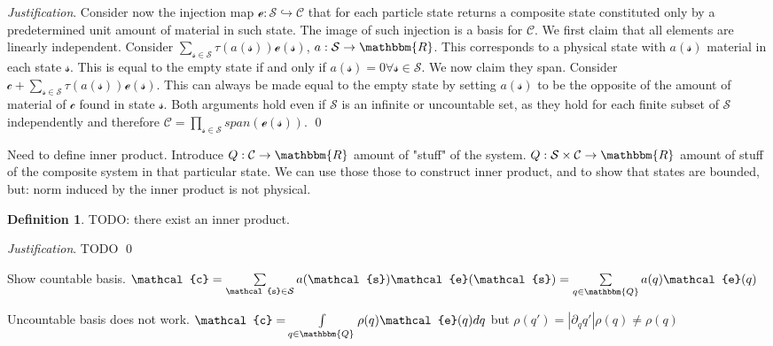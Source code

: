 \documentclass[aps,pra,10pt,twocolumn,floatfix,nofootinbib]{revtex4-1}
\theoremstyle{definition}
\newtheorem{defn}[prop]{Definition}
\newenvironment{justification}{\emph{Justification}.}{\qed}
\begin{document}
\begin{justification}
Consider now the injection map $\mathcal{e}: \mathcal{S} \hookrightarrow \mathcal{C}$ that for each particle state returns a composite state constituted only by a predetermined unit amount of material in such state. The image of such injection is a basis for $\mathcal{C}$. We first claim that all elements are linearly independent. Consider $\sum\limits_{\mathcal{s} \in \mathcal{S}} \tau(a(\mathcal{s})) \mathcal{e}(\mathcal{s})$, $a: \mathcal{S} \to \mathbbm{R}$. This corresponds to a physical state with $a(\mathcal{s})$ material in each state $\mathcal{s}$. This is equal to the empty state if and only if $a(\mathcal{s})=0 \forall \mathcal{s} \in \mathcal{S}$. We now claim they span. Consider $\mathcal{c} + \sum\limits_{\mathcal{s} \in \mathcal{S}} \tau(a(\mathcal{s})) \mathcal{e}(\mathcal{s})$. This can always be made equal to the empty state by setting $a(\mathcal{s})$ to be the opposite of the amount of material of $\mathcal{c}$ found in state $\mathcal{s}$. Both arguments hold even if $\mathcal{S}$ is an infinite or uncountable set, as they hold for each finite subset of $\mathcal{S}$ independently and therefore $\mathcal{C}=\prod\limits_{\mathcal{s} \in \mathcal{S}} span({\mathcal{e}(\mathcal{s})})$.
\end{justification}

Need to define inner product. Introduce $Q:\mathcal{C} \to \mathbbm{R}$ amount of "stuff" of the system. $Q:\mathcal{S}\times\mathcal{C} \to \mathbbm{R}$ amount of stuff of the composite system in that particular state. We can use those those to construct inner product, and to show that states are bounded, but: norm induced by the inner product is not physical.

\begin{defn}\label{classical_inner_product}
	TODO: there exist an inner product.
\end{defn}

\begin{justification}
	TODO
\end{justification}

Show countable basis. $\mathcal{c}= \sum\limits_{\mathcal{s} \in \mathcal{S}} a(\mathcal{s}) \mathcal{e}(\mathcal{s})=\sum\limits_{q \in \mathbbm{Q}} a(q) \mathcal{e}(q)$


Uncountable basis does not work. $\mathcal{c}= \int\limits_{q \in \mathbbm{Q}} \rho(q) \mathcal{e}(q)dq$ but $\rho(q')=|\partial _{q}q'|\rho(q)\neq\rho(q)$
\end{document}
